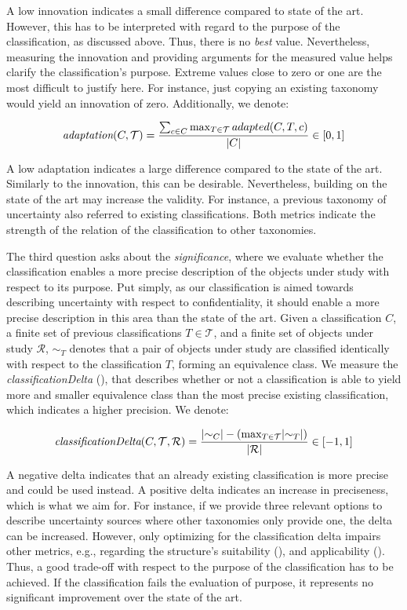 A low innovation indicates a small difference compared to state of the art.
However, this has to be interpreted with regard to the purpose of the classification, as discussed above.
Thus, there is no \emph{best} value.
Nevertheless, measuring the innovation and providing arguments for the measured value helps clarify the classification's purpose.
Extreme values close to zero or one are the most difficult to justify here.
For instance, just copying an existing taxonomy would yield an innovation of zero.
Additionally, we denote:

\begin{equation*}
  \emph{adaptation}(C,\mathcal{T}) = \frac{\sum\nolimits_{c\in C} \max_{T\in\mathcal{T}} adapted(C,T,c) }{\lvert C \rvert} \in [0,1]
\end{equation*}

A low adaptation indicates a large difference compared to the state of the art.
Similarly to the innovation, this can be desirable.
Nevertheless, building on the state of the art may increase the validity.
For instance, a previous taxonomy of uncertainty \cite{perez-palacin_uncertainties_2014} also referred to existing classifications.
Both metrics indicate the strength of the relation of the classification to other taxonomies.

\label{gqm:text:q:3:3} 
The third question  asks about the \emph{significance}, where we evaluate whether the classification enables a more precise description of the objects under study with respect to its purpose.
Put simply, as our classification is aimed towards describing uncertainty with respect to confidentiality, it should enable a more precise description in this area than the state of the art.
Given a classification $C$, a finite set of previous classifications $T\in \mathcal{T}$, and a finite set of objects under study $\mathcal{R}$, $\sim_T$ denotes that a pair of objects under study are classified identically with respect to the classification $T$, forming an equivalence class.
We measure the \emph{classificationDelta} (\label{gqm:text:m:3:3:1}), that describes whether or not a classification is able to yield more and smaller equivalence class than the most precise existing classification, which indicates a higher precision.
We denote:

\begin{equation*}
  \emph{classificationDelta}(C,\mathcal{T},\mathcal{R}) = \frac{\lvert\sim_C\rvert - (\max_{T\in \mathcal{T}} \lvert\sim_T\rvert)}{\lvert\mathcal{R}\rvert} \in [-1,1]
\end{equation*}

A negative delta indicates that an already existing classification is more precise and could be used instead.
A positive delta indicates an increase in preciseness, which is what we aim for.
For instance, if we provide three relevant options to describe uncertainty sources where other taxonomies only provide one, the delta can be increased.
However, only optimizing for the classification delta impairs other metrics, e.g., regarding the structure's suitability (), and applicability ().
Thus, a good trade-off with respect to the purpose of the classification has to be achieved.
If the classification fails the evaluation of purpose, it represents no significant improvement over the state of the art.


